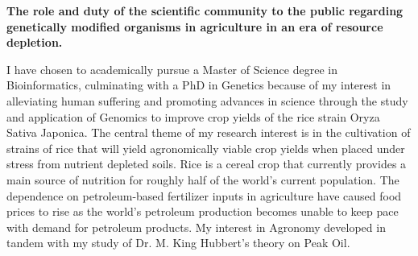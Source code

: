 \documentclass[letterpaper,10pt,twoside]{article}
\begin{document}
\begin{center}
\textbf{\large{The role and duty of the scientific community to the public regarding genetically modified organisms in agriculture in an era of resource depletion.}}
\end{center}
\vspace{0.5em}
I have chosen to academically pursue a Master of Science degree in Bioinformatics, culminating with a PhD in Genetics because of my interest in alleviating human suffering and promoting advances in science through the study and application of Genomics to improve crop yields of the rice strain Oryza Sativa Japonica.  The central theme of my research interest is in the cultivation of strains of rice that will yield agronomically viable crop yields when placed under stress from nutrient depleted soils.  Rice is a cereal crop that currently provides a main source of nutrition for roughly half of the world's current population.  The dependence on petroleum-based fertilizer inputs in agriculture have caused food prices to rise as the world's petroleum production becomes unable to keep pace with demand for petroleum products.  My interest in Agronomy developed in tandem with my study of Dr. M. King Hubbert's theory on Peak Oil.
\end{document}

